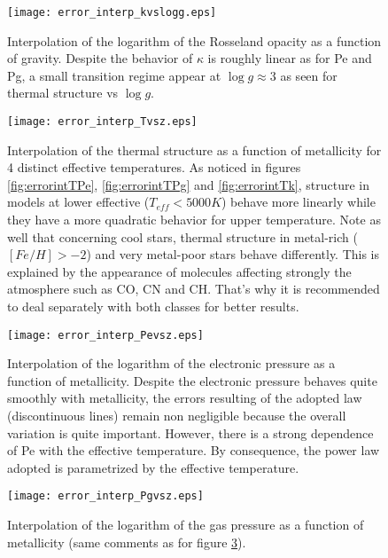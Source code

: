 \documentclass[11pt]{article}
\begin{document}
\begin{figure}[h!]
\begin{center}            
\texttt{[image: error\_interp\_kvslogg.eps]}
\caption{Interpolation of the logarithm of the Rosseland opacity  as a function of gravity. Despite the behavior of $\kappa$ is roughly linear as for Pe and Pg, a small transition regime appear at $\log g \approx 3$ as seen for thermal structure  vs $\log g$. }\label{fig:errorintgk}
\end{center}
\end{figure}

\begin{figure}[h!]
\begin{center}
\texttt{[image: error\_interp\_Tvsz.eps]}
\caption{Interpolation of the thermal structure as a function of metallicity for 4 distinct effective temperatures. As noticed in figures \ref{fig:errorintTPe}, \ref{fig:errorintTPg} and \ref{fig:errorintTk}, structure in models at lower effective ($T_{eff} <5000K$) behave more linearly while they have a more quadratic behavior for upper temperature. Note as well that concerning cool stars, thermal structure in metal-rich ($[Fe/H] >-2$) and very metal-poor stars behave differently. This is explained by the appearance of molecules affecting strongly the atmosphere such as CO, CN and CH. That's why it is recommended to deal separately with both classes for better results.  }\label{fig:errorintzT}
\end{center}
\end{figure}

\begin{figure}[h!]
\begin{center}
\texttt{[image: error\_interp\_Pevsz.eps]}
\caption{Interpolation of the logarithm of the electronic pressure as a function of metallicity. Despite the electronic pressure behaves quite smoothly with metallicity, the errors resulting of the adopted law (discontinuous lines) remain non negligible because the overall variation is quite important. However, there is a strong dependence of Pe with the effective temperature. By consequence, the power law adopted is parametrized by the effective temperature.  }\label{fig:errorintzPe}
\end{center}
\end{figure}

\begin{figure}[h!]
\begin{center}
\texttt{[image: error\_interp\_Pgvsz.eps]}
\caption{Interpolation of the logarithm of the gas pressure as a function of metallicity (same comments as for figure \ref{fig:errorintzPe}).}\label{fig:errorintzPg}
\end{center}
\end{figure}
\end{document}
